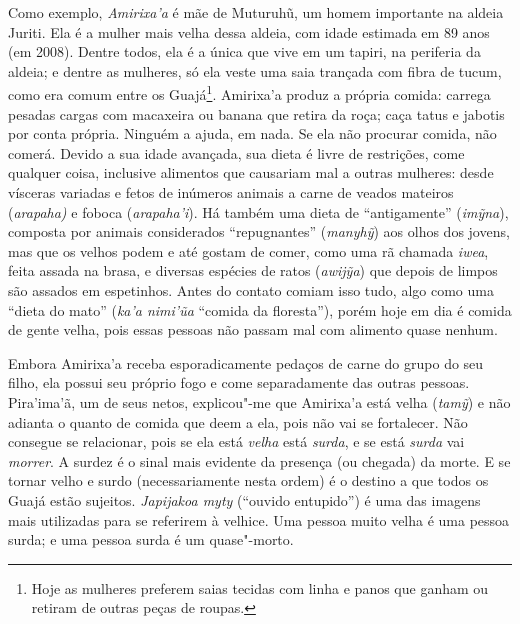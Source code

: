 Como exemplo, \emph{Amirixa'a} é mãe de Muturuhũ, um homem importante na
aldeia Juriti. Ela é a mulher mais velha dessa aldeia, com idade
estimada em 89 anos (em 2008). Dentre todos, ela é a única que vive em
um tapiri, na periferia da aldeia; e dentre as mulheres, só ela veste
uma saia trançada com fibra de tucum, como era comum entre os
Guajá\footnote{Hoje as mulheres preferem saias tecidas com linha e panos
  que ganham ou retiram de outras peças de roupas.}. Amirixa'a produz a
própria comida: carrega pesadas cargas com macaxeira ou banana que
retira da roça; caça tatus e jabotis por conta própria. Ninguém a ajuda,
em nada. Se ela não procurar comida, não comerá. Devido a sua idade
avançada, sua dieta é livre de restrições, come qualquer coisa,
inclusive alimentos que causariam mal a outras mulheres: desde vísceras
variadas e fetos de inúmeros animais a carne de veados mateiros
(\emph{arapaha)} e foboca (\emph{arapaha'i}). Há também uma dieta de
``antigamente'' (\emph{imỹna}), composta por animais considerados
``repugnantes'' (\emph{manyhỹ}) aos olhos dos jovens, mas que os velhos
podem e até gostam de comer, como uma rã chamada \emph{iwea}, feita
assada na brasa, e diversas espécies de ratos (\emph{awijỹa}) que depois
de limpos são assados em espetinhos. Antes do contato comiam isso tudo,
algo como uma ``dieta do mato'' (\emph{ka'a nimi'ũa} ``comida da
floresta''), porém hoje em dia é comida de gente velha, pois essas
pessoas não passam mal com alimento quase nenhum.

Embora Amirixa'a receba esporadicamente pedaços de carne do grupo do seu
filho, ela possui seu próprio fogo e come separadamente das outras
pessoas. Pira'ima'ã, um de seus netos, explicou"-me que Amirixa'a está
velha (\emph{tamỹ}) e não adianta o quanto de comida que deem a ela,
pois não vai se fortalecer. Não consegue se relacionar, pois se ela está
\emph{velha} está \emph{surda}, e se está \emph{surda} vai
\emph{morrer}. A surdez é o sinal mais evidente da presença (ou chegada)
da morte. E se tornar velho e surdo (necessariamente nesta ordem) é o
destino a que todos os Guajá estão sujeitos. \emph{Japijakoa myty}
(``ouvido entupido'') é uma das imagens mais utilizadas para se referirem
à velhice. Uma pessoa muito velha é uma pessoa surda; e uma pessoa surda
é um quase"-morto.

